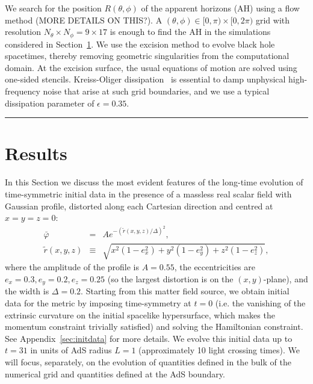 \documentclass[a4paper,11pt]{article}
\begin{document}
We search for the position $R(\theta,\phi)$ of the apparent horizons (AH) using a flow method (MORE DETAILS ON THIS?). A $(\theta,\phi)\in [0,\pi)\times [0,2\pi)$ grid with resolution $N_\theta\times N_\phi=9\times 17$ is enough to find the AH in the simulations considered in Section~\ref{sec:results}. We use the excision method to evolve black hole spacetimes, thereby removing geometric singularities from the computational domain. At the excision surface, the usual equations of motion are solved using one-sided stencils. 
Kreiss-Oliger dissipation~\cite{kreiss1973methods} is essential to damp unphysical high-frequency noise that arise at such grid boundaries, and we use a typical dissipation parameter of $\epsilon=0.35$.

\medskip\hrule height 2pt %

\section{Results}\label{sec:results}

In this Section we discuss the most evident features of the long-time evolution of time-symmetric initial data in the presence of a massless real scalar field with Gaussian profile, distorted along each Cartesian direction and centred at $x=y=z=0$:
\begin{eqnarray}
\label{eq:scaGaupro}
\bar{\varphi}&=&A e^{-(\tilde{r}(x,y,z)/\Delta)^2},\\
\tilde{r}(x,y,z)&\equiv&\sqrt{ x^2(1-e_x^2)+ y^2(1-e_y^2)+ z^2(1-e_z^2)}, \nonumber
\end{eqnarray}
where the amplitude of the profile is $A=0.55$, the eccentricities are $e_x=0.3, e_y=0.2, e_z=0.25$ (so the largest distortion is on the $(x,y)$-plane), and the width is $\Delta=0.2$. Starting from this matter field source, we obtain initial data for the metric by imposing time-symmetry at $t=0$ (i.e. the vanishing of the extrinsic curvature on the initial spacelike hypersurface, which makes the momentum constraint trivially satisfied) and solving the Hamiltonian constraint. See Appendix~\ref{sec:initdata} for more details. We evolve this initial data up to $t=31$ in units of AdS radius $L=1$ (approximately 10 light crossing times).  We will focus, separately, on the evolution of quantities defined in the bulk of the numerical grid and quantities defined at the AdS boundary.

\end{document}

